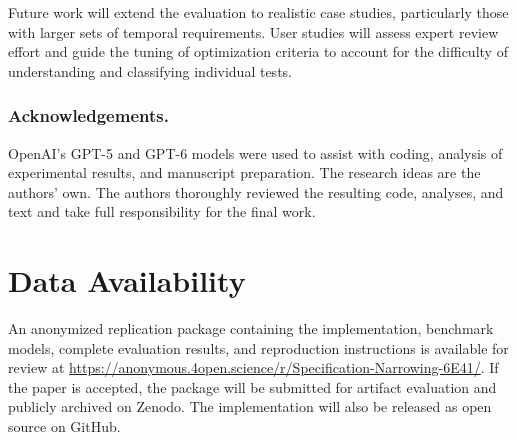 \documentclass[runningheads]{llncs}
\begin{document}
Future work will extend the evaluation to realistic case studies, particularly
those with larger sets of temporal requirements. User studies will assess
expert review effort and guide the tuning of optimization criteria to account
for the difficulty of understanding and classifying individual tests.

\subsubsection*{Acknowledgements.}
OpenAI's GPT-5 and GPT-6 models were used to assist with coding, analysis of
experimental results, and manuscript preparation. The research ideas are the
authors' own. The authors thoroughly reviewed the resulting code, analyses,
and text and take full responsibility for the final work.

\section*{Data Availability}
An anonymized replication package containing the implementation, benchmark
models, complete evaluation results, and reproduction instructions is available
for review at \url{https://anonymous.4open.science/r/Specification-Narrowing-6E41/}.
If the paper is accepted, the package will be submitted for artifact evaluation
and publicly archived on Zenodo. The implementation will also be released as
open source on GitHub.



\end{document}
